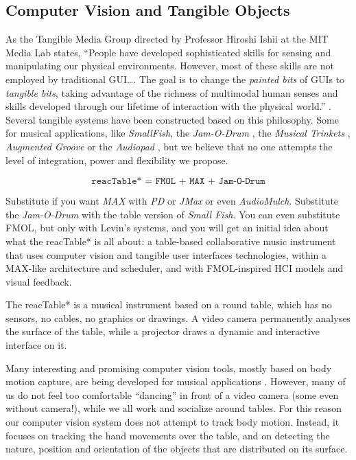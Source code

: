 \subsection{Computer Vision and Tangible  Objects}

As the Tangible Media Group directed by Professor Hiroshi Ishii at the
MIT Media Lab states, ``People have developed sophisticated skills for sensing 
and  manipulating our physical environments. However, most of these skills are  not employed by traditional GUI\ldots{}. The goal is to change the \textit{painted bits}
of GUIs to \textit{tangible  bits}, taking  advantage of the richness of multimodal human
senses and skills developed through our lifetime of interaction with the physical
world.'' \cite{Ishii:1997}.  Several  tangible  systems  have  been  constructed based on
this philosophy. Some for musical applications,  like \textit{SmallFish}, the 
\textit{Jam-O-Drum} \cite{Blaine:2000,Blaine:2002}, the  \textit{Musical Trinkets} \cite{Paradiso:2000a}, \textit{Augmented Groove} \cite{Poupyrev:2000} or the \textit{Audiopad} \cite{Patten:2002}, but we believe that no one attempts the level of integration, power and flexibility we propose.

\begin{equation*}
\texttt{reacTable* = FMOL + MAX + Jam-O-Drum}
\end{equation*}

Substitute if  you  want  \textit{MAX} with \textit{PD} or \textit{JMax} or  even \textit{AudioMulch}. Substitute the \textit{Jam-O-Drum} with the table version of \textit{Small Fish}. You can even substitute FMOL, but only  with Levin's systems, and you will get an initial idea about what the reacTable* is all about:  a table-based collaborative  music instrument that uses computer vision and  tangible user interfaces technologies, within a MAX-like architecture  and scheduler, and with FMOL-inspired HCI models and visual feedback.

The reacTable* is a musical instrument based  on  a round table,  which  has  no
 sensors,  no  cables,  no   graphics  or drawings. A video camera permanently
analyses the surface of the table, while a projector draws a dynamic and
interactive interface on it.

Many interesting and promising computer vision tools, mostly based on body
motion capture, are being developed  for musical applications \cite{Camurri:2001,Camurri:2002}. 
However, many of us  do  not feel too comfortable ``dancing'' in front of a
video camera (some even without camera!), while we all work and socialize around
tables. For this reason our computer vision  system  does  not attempt to track
body motion. Instead, it focuses on  tracking the  hand  movements  over  the 
table,  and  on  detecting  the nature, position and orientation of the objects
that are distributed on its surface.

